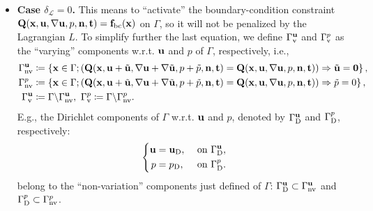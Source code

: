 \documentclass[oneside]{book}
\numberwithin{equation}{section}
\begin{document}
\begin{itemize}[leftmargin=0in]
    \item \textbf{Case $\delta_{\mathcal{L}} = 0$.} This means to ``activate'' the boundary-condition constraint ${\bf Q}({\bf x},{\bf u},\nabla{\bf u},p,{\bf n},{\bf t}) = {\bf f}_{\rm bc}({\bf x})$ on $\Gamma$, so it will not be penalized by the Lagrangian $L$. To simplify further the last equation, we define $\Gamma_{\rm v}^{\bf u}$ and $\Gamma_{\rm v}^p$ as the ``varying'' components w.r.t. ${\bf u}$ and $p$ of $\Gamma$, respectively, i.e.,
    \begin{align*}
        \Gamma_{\rm nv}^{\bf u} &\coloneqq\left\{{\bf x}\in\Gamma;\left({\bf Q}({\bf x},{\bf u} + \tilde{\bf u},\nabla{\bf u} + \nabla\tilde{\bf u},p + \tilde{p},{\bf n},{\bf t}) = {\bf Q}({\bf x},{\bf u},\nabla{\bf u},p,{\bf n},{\bf t})\right)\Rightarrow\tilde{\bf u} = {\bf 0}\right\},\\
        \Gamma_{\rm nv}^p &\coloneqq\left\{{\bf x}\in\Gamma;\left({\bf Q}({\bf x},{\bf u} + \tilde{\bf u},\nabla{\bf u} + \nabla\tilde{\bf u},p + \tilde{p},{\bf n},{\bf t}) = {\bf Q}({\bf x},{\bf u},\nabla{\bf u},p,{\bf n},{\bf t})\right)\Rightarrow\tilde{p} = 0\right\},\\
        \Gamma_{\rm v}^{\bf u} &\coloneqq\Gamma\backslash\Gamma_{\rm nv}^{\bf u},\ \Gamma_{\rm v}^p\coloneqq\Gamma\backslash\Gamma_{\rm nv}^p.
    \end{align*}
    E.g., the Dirichlet components of $\Gamma$ w.r.t. ${\bf u}$ and $p$, denoted by $\Gamma_{\rm D}^{\bf u}$ and $\Gamma_{\rm D}^p$, respectively:
    \begin{equation*}
        \left\{\begin{split}
            {\bf u} &= {\bf u}_{\rm D},&&\mbox{ on } \Gamma_{\rm D}^{\bf u},\\
            p &= p_{\rm D},&&\mbox{ on } \Gamma_{\rm D}^p.
        \end{split}\right.
    \end{equation*}
    belong to the ``non-variation'' components just defined of $\Gamma$: $\Gamma_{\rm D}^{\bf u}\subset\Gamma_{\rm nv}^{\bf u}$ and $\Gamma_{\rm D}^p\subset\Gamma_{\rm nv}^p$.
    

\end{itemize}
\end{document}
